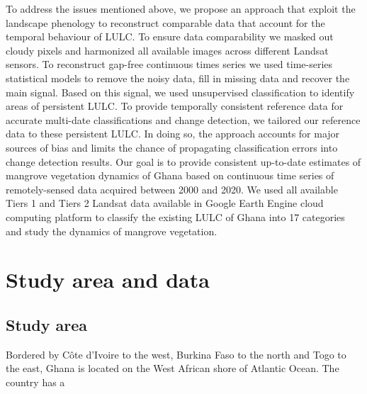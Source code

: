 \documentclass[12pt,oneside,preprint,3p,authoryear,times]{elsarticle} %
\begin{document}
To address the issues mentioned above, we propose an approach that
exploit the landscape phenology to reconstruct comparable data that
account for the temporal behaviour of LULC. To ensure data comparability
we masked out cloudy pixels and harmonized all available images across
different Landsat sensors. To reconstruct gap-free continuous times
series we used time-series statistical models to remove the noisy data,
fill in missing data and recover the main signal. Based on this signal,
we used unsupervised classification to identify areas of persistent
LULC. To provide temporally consistent reference data for accurate
multi-date classifications and change detection, we tailored our
reference data to these persistent LULC. In doing so, the approach
accounts for major sources of bias and limits the chance of propagating
classification errors into change detection results. Our goal is to
provide consistent up-to-date estimates of mangrove vegetation dynamics
of Ghana based on continuous time series of remotely-sensed data
acquired between 2000 and 2020. We used all available Tiers 1 and Tiers
2 Landsat data available in Google Earth Engine cloud computing platform
to classify the existing LULC of Ghana into 17 categories and study the
dynamics of mangrove vegetation.

\hypertarget{study-area-and-data}{%
\section{Study area and data}\label{study-area-and-data}}

\hypertarget{study-area}{%
\subsection{Study area}\label{study-area}}

Bordered by Côte d'Ivoire to the west, Burkina Faso to the north and
Togo to the east, Ghana is located on the West African shore of Atlantic
Ocean. The country has a
\end{document}
